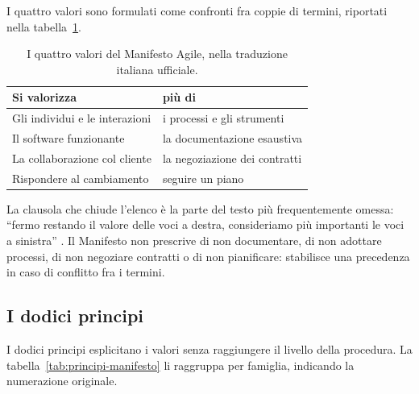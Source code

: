 I quattro valori sono formulati come confronti fra coppie di termini, riportati
nella tabella~\ref{tab:valori-manifesto}.

\begin{table}[htbp]
\centering
\small
\caption{I quattro valori del Manifesto Agile, nella traduzione italiana
ufficiale.}
\label{tab:valori-manifesto}
\begin{tabularx}{\textwidth}{@{}XX@{}}
\toprule
\textbf{Si valorizza} & \textbf{pi\`u di} \\
\midrule
Gli individui e le interazioni & i processi e gli strumenti \\
Il software funzionante & la documentazione esaustiva \\
La collaborazione col cliente & la negoziazione dei contratti \\
Rispondere al cambiamento & seguire un piano \\
\bottomrule
\end{tabularx}
\end{table}

La clausola che chiude l'elenco \`e la parte del testo pi\`u frequentemente
omessa: ``fermo restando il valore delle voci a destra, consideriamo pi\`u
importanti le voci a sinistra'' \cite{agilemanifesto}.
Il Manifesto non prescrive di non documentare, di non adottare
processi, di non negoziare contratti o di non pianificare: stabilisce una
precedenza in caso di conflitto fra i termini.

\subsection{I dodici principi}

I dodici principi esplicitano i valori senza raggiungere il livello della
procedura. La tabella~\ref{tab:principi-manifesto} li raggruppa per famiglia,
indicando la numerazione originale.


